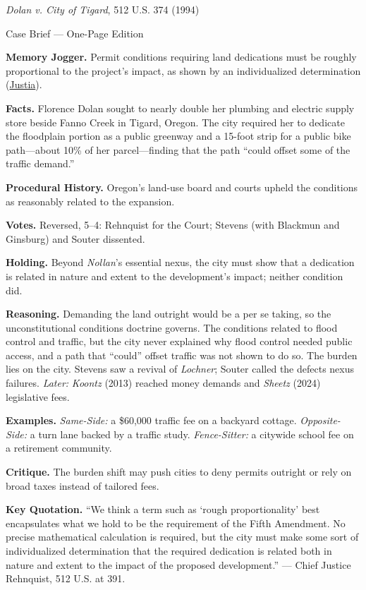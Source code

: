 \documentclass[12pt]{article}
\begin{document}
\begin{center}
{\Large \textit{Dolan v. City of Tigard}, 512 U.S. 374 (1994)\par}
\vspace{0.3em}
{\normalsize Case Brief --- One-Page Edition\par}
\end{center}

\textbf{Memory Jogger.} Permit conditions requiring land dedications must be roughly proportional to the project's impact, as shown by an individualized determination (\href{https://supreme.justia.com/cases/federal/us/512/374/}{Justia}).

\textbf{Facts.} Florence Dolan sought to nearly double her plumbing and electric supply store beside Fanno Creek in Tigard, Oregon. The city required her to dedicate the floodplain portion as a public greenway and a 15-foot strip for a public bike path---about 10\% of her parcel---finding that the path ``could offset some of the traffic demand.''

\textbf{Procedural History.} Oregon's land-use board and courts upheld the conditions as reasonably related to the expansion.

\textbf{Votes.} Reversed, 5--4: Rehnquist for the Court; Stevens (with Blackmun and Ginsburg) and Souter dissented.

\textbf{Holding.} Beyond \textit{Nollan}'s essential nexus, the city must show that a dedication is related in nature and extent to the development's impact; neither condition did.

\textbf{Reasoning.} Demanding the land outright would be a per se taking, so the unconstitutional conditions doctrine governs. The conditions related to flood control and traffic, but the city never explained why flood control needed public access, and a path that ``could'' offset traffic was not shown to do so. The burden lies on the city. Stevens saw a revival of \textit{Lochner}; Souter called the defects nexus failures. \emph{Later:} \textit{Koontz} (2013) reached money demands and \textit{Sheetz} (2024) legislative fees.

\textbf{Examples.} \emph{Same-Side:} a \$60,000 traffic fee on a backyard cottage. \emph{Opposite-Side:} a turn lane backed by a traffic study. \emph{Fence-Sitter:} a citywide school fee on a retirement community.

\textbf{Critique.} The burden shift may push cities to deny permits outright or rely on broad taxes instead of tailored fees.

\textbf{Key Quotation.} ``We think a term such as `rough proportionality' best encapsulates what we hold to be the requirement of the Fifth Amendment. No precise mathematical calculation is required, but the city must make some sort of individualized determination that the required dedication is related both in nature and extent to the impact of the proposed development.'' --- Chief Justice Rehnquist, 512 U.S. at 391.
\end{document}
